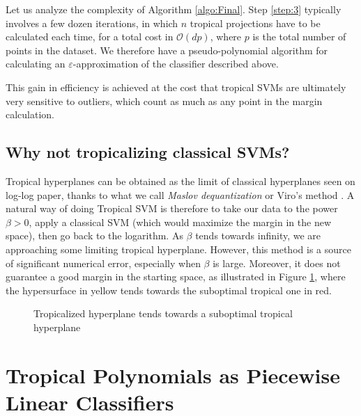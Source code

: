 \documentclass[oneside,UKenglish,a4paper]{amsart}
\numberwithin{equation}{section}
\numberwithin{figure}{section}
\theoremstyle{plain}
\theoremstyle{definition}
\theoremstyle{plain}
\theoremstyle{remark}
\theoremstyle{plain}
\theoremstyle{definition}
\theoremstyle{definition}
\begin{document}
Let us analyze the complexity of Algorithm \ref{algo:Final}. Step \ref{step:3} typically involves a few dozen iterations, in which $n$ tropical projections have to be calculated each time, for a total cost in $\mathcal{O}(dp)$, where $p$ is the total number of points in the dataset. We therefore have a pseudo-polynomial algorithm for calculating an $\varepsilon$-approximation of the classifier described above.

This gain in efficiency is achieved at the cost that tropical SVMs are ultimately very sensitive to outliers, which count as much as any point in the margin calculation.

\subsection*{Why not tropicalizing classical SVMs?}

Tropical hyperplanes can be obtained as the limit of classical hyperplanes seen on log-log paper, thanks to what we call \emph{Maslov dequantization} \cite{litvinov2005maslov} or Viro's method \cite{viro2000dequantization}. A natural way of doing Tropical SVM is therefore to take our data to the power $\beta > 0$, apply a classical SVM (which would maximize the margin in the new space), then go back to the logarithm. As $\beta$ tends towards infinity, we are approaching some limiting tropical hyperplane. However, this method is a source of significant numerical error, especially when $\beta$ is large. Moreover, it does not guarantee a good margin in the starting space, as illustrated in Figure \ref{fig:LogLog}, where the hypersurface in yellow tends towards the suboptimal tropical one in red.

\begin{figure}[!h]
    \centering
    \begin{subfigure}{0.45\textwidth}
        \centering
        \resizebox{\linewidth}{!}{%
        \centering
            \clipbox{0.15\width{} 0.15\height{} 0.15\width{} 0.15\height{}}{}}
    \end{subfigure}

    \caption{Tropicalized hyperplane tends towards a suboptimal tropical hyperplane}
    \label{fig:LogLog}
\end{figure}


\section{Tropical Polynomials as Piecewise Linear Classifiers}
\end{document}
